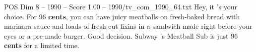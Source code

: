 \begin{textsample}{POS Dim 8 – 1990 – Score 1.00 – 1990/tv\_com\_1990\_64.txt}  \label{ex:f8_pos_076}
Hey, it 's your choice.
For 96 \textbf{cents}, you can have juicy meatballs on fresh-baked bread with marinara sauce and loads of fresh-cut fixins in a sandwich made right before your eyes or a pre-made burger.
Good decision.
Subway 's Meatball Sub is just 96 \textbf{cents} for a limited time.

\end{textsample}
